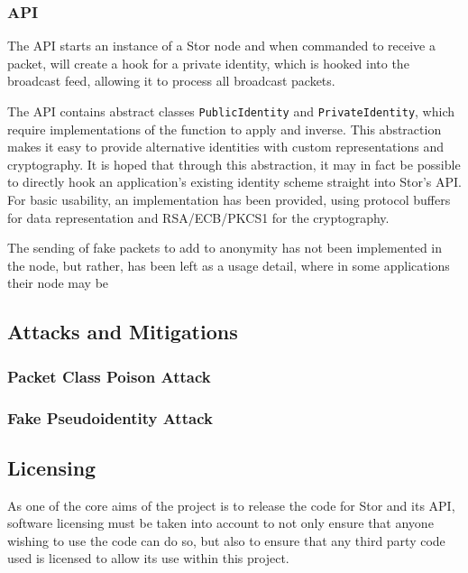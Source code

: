 		\subsubsection*{API}
			The API starts an instance of a Stor node and when commanded to receive a packet, will create a hook for a private identity, which is hooked into the broadcast feed, allowing it to process all broadcast packets.
			
			The API contains abstract classes \texttt{PublicIdentity} and \texttt{PrivateIdentity}, which require implementations of the function to apply and inverse. This abstraction makes it easy to provide alternative identities with custom representations and cryptography. It is hoped that through this abstraction, it may in fact be possible to directly hook an application's existing identity scheme straight into Stor's API. For basic usability, an implementation has been provided, using protocol buffers for data representation and RSA/ECB/PKCS1 for the cryptography.
			
			The sending of fake packets to add to anonymity has not been implemented in the node, but rather, has been left as a usage detail, where in some applications their node may be
		\subsection{Attacks and Mitigations}
			\subsubsection*{Packet Class Poison Attack}
			\subsubsection*{Fake Pseudoidentity Attack}
		\subsection{Licensing}
			As one of the core aims of the project is to release the code for Stor and its API, software licensing must be taken into account to not only ensure that anyone wishing to use the code can do so, but also to ensure that any third party code used is licensed to allow its use within this project.
